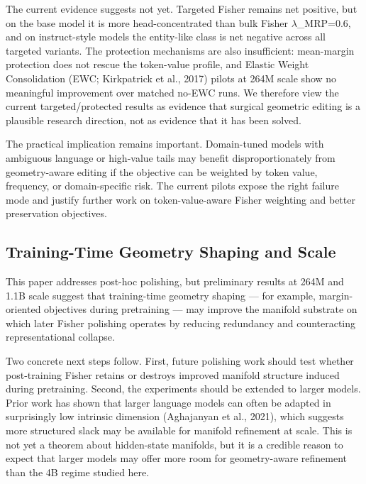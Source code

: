\documentclass[
  11pt,
]{article}
\begin{document}
The current evidence suggests not yet. Targeted Fisher remains net
positive, but on the base model it is more head-concentrated than bulk
Fisher $\lambda$\_MRP=0.6, and on instruct-style models the entity-like class is
net negative across all targeted variants. The protection mechanisms are
also insufficient: mean-margin protection does not rescue the
token-value profile, and Elastic Weight Consolidation (EWC; Kirkpatrick
et al., 2017) pilots at 264M scale show no meaningful improvement over
matched no-EWC runs. We therefore view the current targeted/protected
results as evidence that surgical geometric editing is a plausible
research direction, not as evidence that it has been solved.

The practical implication remains important. Domain-tuned models with
ambiguous language or high-value tails may benefit disproportionately
from geometry-aware editing if the objective can be weighted by token
value, frequency, or domain-specific risk. The current pilots expose the
right failure mode and justify further work on token-value-aware Fisher
weighting and better preservation objectives.

\hypertarget{training-time-geometry-shaping-and-scale}{%
\subsection{Training-Time Geometry Shaping and
Scale}\label{training-time-geometry-shaping-and-scale}}

This paper addresses post-hoc polishing, but preliminary results at 264M
and 1.1B scale suggest that training-time geometry shaping --- for
example, margin-oriented objectives during pretraining --- may improve
the manifold substrate on which later Fisher polishing operates by
reducing redundancy and counteracting representational collapse.

Two concrete next steps follow. First, future polishing work should test
whether post-training Fisher retains or destroys improved manifold
structure induced during pretraining. Second, the experiments should be
extended to larger models. Prior work has shown that larger language
models can often be adapted in surprisingly low intrinsic dimension
(Aghajanyan et al., 2021), which suggests more structured slack may be
available for manifold refinement at scale. This is not yet a theorem
about hidden-state manifolds, but it is a credible reason to expect that
larger models may offer more room for geometry-aware refinement than the
4B regime studied here.
\end{document}
